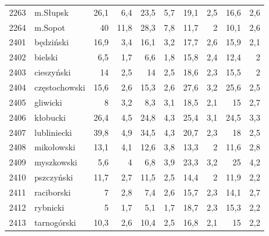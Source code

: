 \begin{center}
\begin{longtable}{lp{3cm}rrrrrrrr}
2263 & m.Słupsk                & 26,1    & 6,4         & 23,5     & 5,7          & 19,1     & 2,5          & 16,6     & 2,6          \\
2264 & m.Sopot                 & 40      & 11,8        & 28,3     & 7,8          & 11,7     & 2            & 10,1     & 2,6          \\
2401 & będziński               & 16,9    & 3,4         & 16,1     & 3,2          & 17,7     & 2,6          & 15,9     & 2,1          \\
2402 & bielski                 & 6,5     & 1,7         & 6,6      & 1,8          & 15,8     & 2,4          & 12,4     & 2            \\
2403 & cieszyński              & 14      & 2,5         & 14       & 2,5          & 18,6     & 2,3          & 15,5     & 2            \\
2404 & częstochowski           & 15,6    & 2,6         & 15,3     & 2,6          & 27,6     & 3,2          & 25,6     & 2,5          \\
2405 & gliwicki                & 8       & 3,2         & 8,3      & 3,1          & 18,5     & 2,1          & 15       & 2,7          \\
2406 & kłobucki                & 26,4    & 4,5         & 24,8     & 4,3          & 25,4     & 3,1          & 24,5     & 3,3          \\
2407 & lubliniecki             & 39,8    & 4,9         & 34,5     & 4,3          & 20,7     & 2,3          & 18       & 2,5          \\
2408 & mikołowski              & 13,1    & 4,1         & 12,6     & 3,8          & 13,3     & 2            & 11,6     & 2,8          \\
2409 & myszkowski              & 5,6     & 4           & 6,8      & 3,9          & 23,3     & 3,2          & 25       & 4,2          \\
2410 & pszczyński              & 11,7    & 2,7         & 11,5     & 2,5          & 14,4     & 2            & 11,9     & 2,2          \\
2411 & raciborski              & 7       & 2,8         & 7,4      & 2,6          & 15,7     & 2,3          & 14,1     & 2,7          \\
2412 & rybnicki                & 5       & 1,7         & 5,1      & 1,7          & 18,7     & 2,3          & 15,3     & 2,2          \\
2413 & tarnogórski             & 10,3    & 2,6         & 10,4     & 2,5          & 16,8     & 2,1          & 15       & 2,2          \\

\end{longtable}
\end{center}
